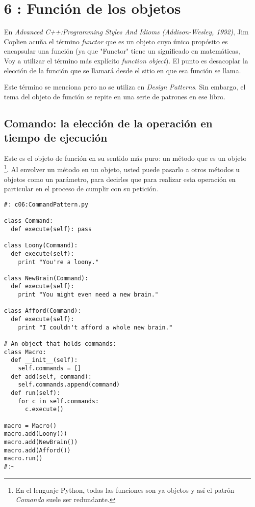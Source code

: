 \section*{6 : Función de los objetos}
\label{sec:fdlo}


En \textit{Advanced C++:Programming Styles And Idioms (Addison-Wesley, 1992)},  Jim Coplien acuña el término \textit{functor} que es un objeto cuyo único propósito es encapsular una función (ya que "Functor" tiene un significado en matemáticas, Voy a utilizar el término más explícito  \textit{function object}). El punto es desacoplar la elección de la función que se llamará desde el sitio en que esa función se llama.   \newline

Este término se menciona pero no se utiliza en \textit{Design Patterns}. Sin embargo, el tema del objeto de función se repite en una serie de patrones en ese libro.    \newline

\subsection*{Comando: la elección de la operación en tiempo de ejecución}
\label{subsec:cledloetde}


Este es el objeto de función en su sentido más puro: un método que es un objeto \footnote{En el lenguaje Python, todas las funciones son ya objetos y así el patrón \textit{Comando} suele ser redundante.}. Al envolver un método en un objeto, usted puede pasarlo a otros métodos u objetos como un parámetro, para decirles que para realizar esta operación en particular en el proceso de cumplir con su petición.     \newline

\begin{lstlisting}
#: c06:CommandPattern.py 

class Command: 
  def execute(self): pass 
  
class Loony(Command): 
  def execute(self): 
    print "You're a loony." 
    
class NewBrain(Command): 
  def execute(self): 
    print "You might even need a new brain." 
    
class Afford(Command): 
  def execute(self): 
    print "I couldn't afford a whole new brain."
    
# An object that holds commands: 
class Macro: 
  def __init__(self): 
    self.commands = [] 
  def add(self, command):  
    self.commands.append(command)  
  def run(self): 
    for c in self.commands: 
      c.execute() 
      
macro = Macro() 
macro.add(Loony()) 
macro.add(NewBrain()) 
macro.add(Afford()) 
macro.run() 
#:~       
\end{lstlisting}

